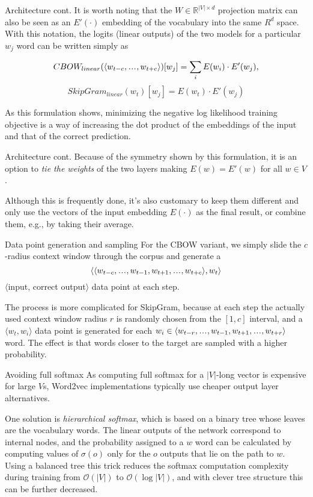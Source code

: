 \documentclass[style=upen, size=14pt]{powerdot}
\newcommand\varlist{,\makebox[1em][c]{.\hfil.\hfil.},}
\newcommand{\gold}{\color{arany}}
\theoremstyle{definition}
\begin{document}
\begin{slide}[toc=]{Architecture cont.}
  It is worth noting that the $W \in \mathbb R^{|V|\times d}$ projection matrix
  can also be seen as an $E'(\cdot)$ embedding of the vocabulary into the same
  $R^d$ space. With this notation, the logits (linear outputs) of the two
  models for a particular $w_j$ word can be written simply as
  \begin{small}
  $$
  CBOW_{linear}(\langle w_{t-c}\varlist w_{t+c} \rangle)[w_j] = \sum_{i}E(w_i) \cdot E'(w_j),
  $$
  $$
  SkipGram_{linear}(w_t)[w_j] = E(w_t) \cdot E'(w_j)
  $$
\end{small}
As this formulation shows, minimizing the negative log likelihood training
objective is a way of increasing the dot product of the embeddings of the input
and that of the correct prediction.
\end{slide}

\begin{slide}[toc=]{Architecture cont.}
  Because of the symmetry shown by this formulation, it is an option to
  \emph{tie the weights} of the two layers making $E(w) = E'(w)$ for all
  $w\in V$.

  Although this is frequently done, it's also customary to keep them different
  and only use the vectors of the input embedding $E(\cdot)$ as the final result, or
  combine them, e.g., by taking their average.
\end{slide}

\begin{slide}[toc=Data generation]{Data point generation and sampling}
  For the CBOW variant, we simply slide the $c$-radius context window through
  the corpus and generate a 
  $$\langle \langle w_{t-c}\varlist w_{t-1}, w_{t+1}\varlist w_{t+c} \rangle, w_t \rangle$$
  $\langle$input, correct output$\rangle$ data point at each step.\bigskip

  The process is more complicated for SkipGram, because at each step the
  actually used context window radius $r$ is randomly chosen from the $[1, c]$
  interval, and a $\langle w_t, w_i\rangle$ data point is generated for each
  $w_i\in \langle w_{t-r}\varlist w_{t-1}, w_{t+1}\varlist w_{t+r}\rangle$ word.
  The effect is that words closer to the target are sampled with a higher
  probability.
\end{slide}

\begin{slide}[toc=Softmax alternatives]{Avoiding full softmax}
  As computing full softmax for a $|V|$-long vector is expensive for large $V$s,
  Word2vec implementations typically use cheaper output layer
  alternatives.\bigskip

  One solution is \emph{\gold hierarchical softmax}, which is based on a binary
  tree whose leaves are the vocabulary words. The linear outputs of the network
  correspond to internal nodes, and the probability assigned to a $w$ word can
  be calculated by computing values of $\sigma(o)$ only for the $o$ outputs that
  lie on the path to $w$. Using a balanced tree this trick reduces the softmax
  computation complexity during training from $\mathcal O(|V|)$ to
  $\mathcal O({\log |V|})$, and with clever tree structure this can be further
  decreased.
\end{slide}
\end{document}
